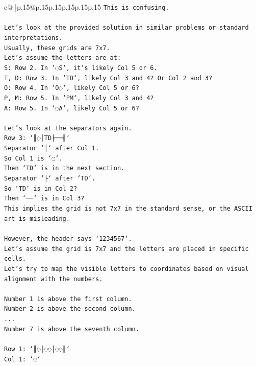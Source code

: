 \documentclass{article}
\begin{document}
{\begin{supertabular}{c@{$\;$}|p{.15\linewidth}@{}p{.15\linewidth}p{.15\linewidth}p{.15\linewidth}p{.15\linewidth}p{.15\linewidth}}
{{{\texttt{This is confusing.} \\
\\ 
\texttt{Let's look at the provided solution in similar problems or standard interpretations.} \\
\texttt{Usually, these grids are 7x7.} \\
\texttt{Let's assume the letters are at:} \\
\texttt{S: Row 2. In `◌S`, it's likely Col 5 or 6.} \\
\texttt{T, D: Row 3. In `TD`, likely Col 3 and 4? Or Col 2 and 3?} \\
\texttt{O: Row 4. In `O◌`, likely Col 5 or 6?} \\
\texttt{P, M: Row 5. In `PM`, likely Col 3 and 4?} \\
\texttt{A: Row 5. In `◌A`, likely Col 5 or 6?} \\
\\ 
\texttt{Let's look at the separators again.} \\
\texttt{Row 3: `║◌│TD├──╢`} \\
\texttt{Separator `│` after Col 1.} \\
\texttt{So Col 1 is `◌`.} \\
\texttt{Then `TD` is in the next section.} \\
\texttt{Separator `├` after `TD`.} \\
\texttt{So `TD` is in Col 2?} \\
\texttt{Then `──` is in Col 3?} \\
\texttt{This implies the grid is not 7x7 in the standard sense, or the ASCII art is misleading.} \\
\\ 
\texttt{However, the header says `1234567`.} \\
\texttt{Let's assume the grid is 7x7 and the letters are placed in specific cells.} \\
\texttt{Let's try to map the visible letters to coordinates based on visual alignment with the numbers.} \\
\\ 
\texttt{Number 1 is above the first column.} \\
\texttt{Number 2 is above the second column.} \\
\texttt{...} \\
\texttt{Number 7 is above the seventh column.} \\
\\ 
\texttt{Row 1: `║◌│◌◌│◌◌║`} \\
\texttt{Col 1: `◌`} \\
}}}
\end{supertabular}}
\end{document}
